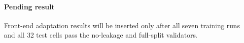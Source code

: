 \documentclass[preprint,12pt]{elsarticle}
\providecommand{\DIFaddend}{} %
\providecommand{\DIFdelbegin}{} %
\begin{document}
{%


}{%
\paragraph{Pending result} Front-end adaptation results will be inserted only after all seven training runs and all 32 test cells pass the no-leakage and full-split validators.
}
\DIFaddend 

\DIFdelbegin %
\end{document}
